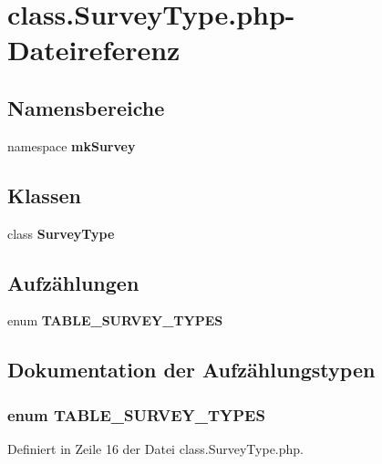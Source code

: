 \section{class.SurveyType.php-Dateireferenz}
\label{class_8SurveyType_8php}
\subsection*{Namensbereiche}
\begin{CompactItemize}
\item 
namespace {\bf mkSurvey}
\end{CompactItemize}
\subsection*{Klassen}
\begin{CompactItemize}
\item 
class {\bf SurveyType}
\end{CompactItemize}
\subsection*{Aufzählungen}
\begin{CompactItemize}
\item 
enum {\bf TABLE\_\-SURVEY\_\-TYPES} 
\end{CompactItemize}


\subsection{Dokumentation der Aufzählungstypen}
\subsubsection{\setlength{\rightskip}{0pt plus 5cm}enum {\bf TABLE\_\-SURVEY\_\-TYPES}}\label{class_8SurveyType_8php_d918b05229e1c71800e71e062a30ce40}




Definiert in Zeile 16 der Datei class.SurveyType.php.
